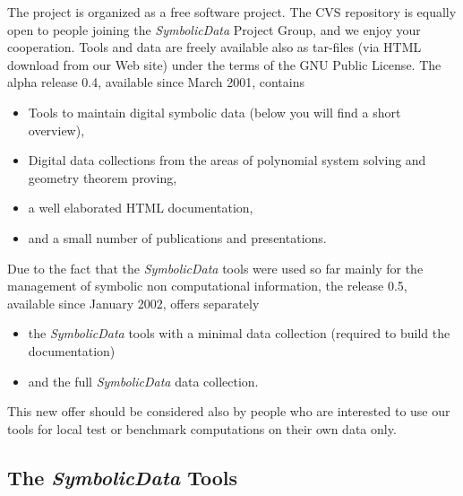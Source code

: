 \documentclass[11pt]{article}
\newcommand{\SD}{{\em Symbo\-lic\-Data}}
\begin{document}
The project is organized as a free software project. The CVS
repository is equally open to people joining the {\SD} Project Group,
and we enjoy your cooperation. Tools and data are freely available
also as tar-files (via HTML download from our Web site) under the
terms of the GNU Public License.  The alpha release 0.4, available
since March 2001, contains
\begin{itemize}\itemsep-2pt
\item Tools to maintain digital symbolic data (below you will find a
short over\-view),
\item Digital data collections from the areas of polynomial
system solving and geometry theorem proving,
\item a well elaborated HTML documentation,
\item and a small number of publications and presentations.
\end{itemize}
Due to the fact that the {\SD} tools were used so far mainly for
the management of symbolic non computational information, the
release 0.5, available since January 2002, offers separately 
\begin{itemize}\itemsep-2pt
\item the {\SD} tools with a minimal data collection (required to build
the documentation)
\item and the full {\SD} data collection. 
\end{itemize}
This new offer should be considered also by people who are interested
to use our tools for local test or benchmark computations on their own
data only.

\subsection{The {\SD} Tools}
\end{document}
